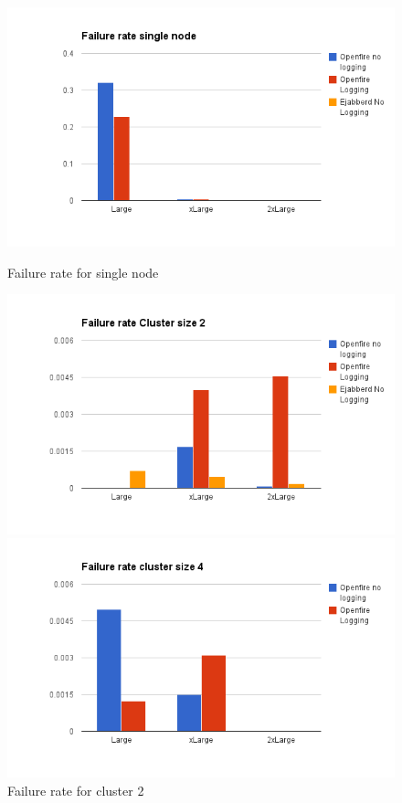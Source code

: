 \documentclass[a4paper, twocolumn]{article}
\begin{document}
\begin{figure}[ht] \label{ fig8} 
  \begin{minipage}[b]{0.5\linewidth}
    \includegraphics[width=0.9\linewidth]{image__16_.png} 
    \caption{Failure rate for single node} 
  \end{minipage} 
  \begin{minipage}[b]{0.5\linewidth}
    \includegraphics[width=0.9\linewidth]{image__17_.png} 
    \caption{Failure rate  for cluster 2} 
  \end{minipage} 
  \begin{minipage}[b]{0.5\linewidth}
    \includegraphics[width=0.9\linewidth]{image__18_.png} 

\end{minipage}
\end{figure}
\end{document}
